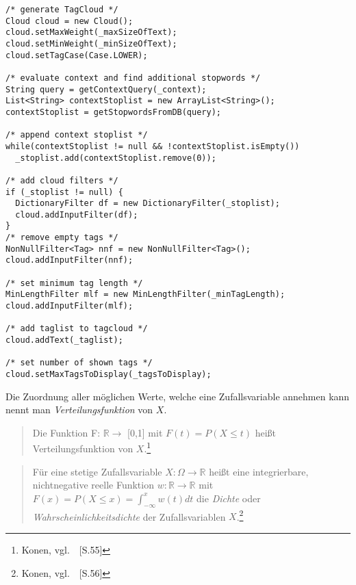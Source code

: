 \lstset{language=java}
\begin{lstlisting}[frame=htrbl, caption={Das Listing zeigt Java Quellcode}, label={lst:result2}]
/* generate TagCloud */
Cloud cloud = new Cloud();
cloud.setMaxWeight(_maxSizeOfText);
cloud.setMinWeight(_minSizeOfText);
cloud.setTagCase(Case.LOWER);
	    
/* evaluate context and find additional stopwords */
String query = getContextQuery(_context);
List<String> contextStoplist = new ArrayList<String>();
contextStoplist = getStopwordsFromDB(query);
	    
/* append context stoplist */
while(contextStoplist != null && !contextStoplist.isEmpty())
  _stoplist.add(contextStoplist.remove(0));
	    
/* add cloud filters */
if (_stoplist != null) {
  DictionaryFilter df = new DictionaryFilter(_stoplist);
  cloud.addInputFilter(df);
}
/* remove empty tags */
NonNullFilter<Tag> nnf = new NonNullFilter<Tag>();
cloud.addInputFilter(nnf);

/* set minimum tag length */
MinLengthFilter mlf = new MinLengthFilter(_minTagLength);
cloud.addInputFilter(mlf);

/* add taglist to tagcloud */
cloud.addText(_taglist);

/* set number of shown tags */	    
cloud.setMaxTagsToDisplay(_tagsToDisplay);
\end{lstlisting}


Die Zuordnung aller möglichen Werte, welche eine Zufallsvariable annehmen kann nennt man \emph{Verteilungsfunktion} von $X$.

\begin{quotation}
Die Funktion F: $\mathbb{R} \rightarrow$ [0,1] mit $F(t) = P (X \le t)$ heißt Verteilungsfunktion von $X$.\footnote{Konen, vgl.~\cite{wk05}~[S.55]}
\end{quotation}

\begin{quotation}
Für eine stetige Zufallsvariable $X: \Omega \rightarrow \mathbb{R}$ heißt eine integrierbare, nichtnegative reelle Funktion $w: \mathbb{R} \rightarrow \mathbb{R}$ mit $F(x) = P(X \le x) = \int_{-\infty}^{x} w(t)dt$ die \emph{Dichte} oder \emph{Wahrscheinlichkeitsdichte} der Zufallsvariablen $X$.\footnote{Konen, vgl.~\cite{wk05}~[S.56]}
\end{quotation}
